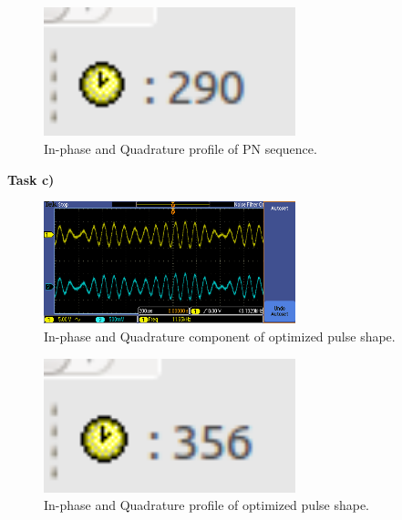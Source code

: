 \documentclass{article}
\begin{document}
\begin{figure}[h]
  \begin{center}
    \includegraphics[width=0.65\textwidth]{img/task_b_profile.png}
    \caption{In-phase and Quadrature profile of PN sequence.}
  \end{center}
\end{figure}

\pagebreak
\textbf{Task c)}

\begin{figure}[h]
  \begin{center}
    \includegraphics[width=0.65\textwidth]{img/task_c_oscilloscope.png}
    \caption{In-phase and Quadrature component of optimized pulse shape.}
  \end{center}
\end{figure}

\begin{figure}[h]
  \begin{center}
    \includegraphics[width=0.65\textwidth]{img/task_c_profile.png}
    \caption{In-phase and Quadrature profile of optimized pulse shape.}
  \end{center}
\end{figure}
\end{document}
